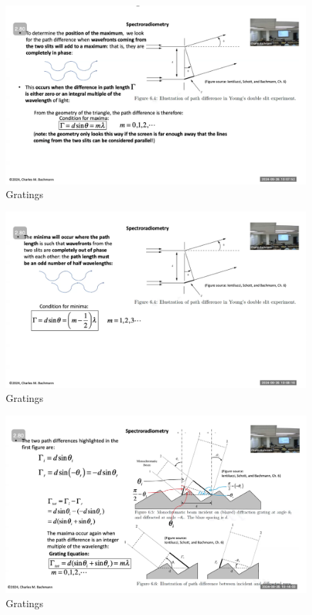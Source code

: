 \documentclass{article}
\begin{document}
\begin{figure}[h!]
\centering
\includegraphics[scale=.4]{Radiometry/Week5/Notes/Gratings/MUM3.png}
\caption{Gratings}
\label{fig:Blackbody}
\end{figure}

\begin{figure}[h!]
\centering
\includegraphics[scale=.4]{Radiometry/Week5/Notes/Gratings/MUM4.png}
\caption{Gratings}
\label{fig:Blackbody}
\end{figure}

\begin{figure}[h!]
\centering
\includegraphics[scale=.4]{Radiometry/Week5/Notes/Gratings/MUM5.png}
\caption{Gratings}
\label{fig:Blackbody}
\end{figure}
\end{document}
